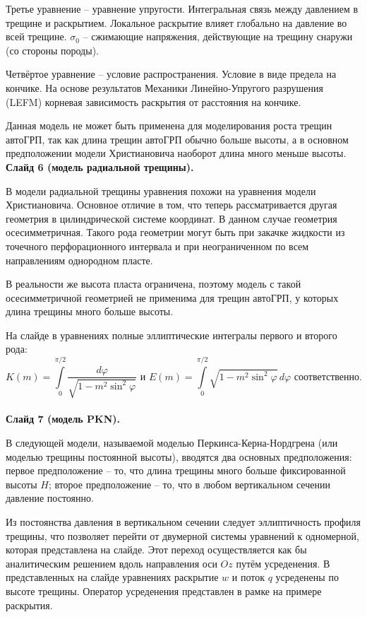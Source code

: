 \documentclass[a4paper, 12pt]{article}
\begin{document}
Третье уравнение -- уравнение упругости.
Интегральная связь между давлением в трещине и раскрытием.
Локальное раскрытие влияет глобально на давление во всей трещине.
$\sigma_0$ -- сжимающие напряжения, действующие на трещину снаружи (со стороны породы).

Четвёртое уравнение -- условие распространения.
Условие в виде предела на кончике.
На основе результатов Механики Линейно-Упругого разрушения (LEFM) корневая зависимость раскрытия от расстояния на кончике.

Данная модель не может быть применена для моделирования роста трещин автоГРП, так как длина трещин автоГРП обычно больше высоты, а в основном предположении модели Христиановича наоборот длина много меньше высоты.\\

\textbf{Слайд 6 (модель радиальной трещины).}

В модели радиальной трещины уравнения похожи на уравнения модели Христиановича.
Основное отличие в том, что теперь рассматривается другая геометрия в цилиндрической системе координат.
В данном случае геометрия осесимметричная.
Такого рода геометрии могут быть при закачке жидкости из точечного перфорационного интервала и при неограниченном по всем направлениям однородном пласте.

В реальности же высота пласта ограничена, поэтому модель с такой осесимметричной геометрией не применима для трещин автоГРП, у которых длина трещины много больше высоты.

На слайде в уравнениях полные эллиптические интегралы первого и второго рода:
$$K(m)=\int\limits_{0}^{\pi/2}{\frac{d\varphi}{\sqrt{1-m^2\sin^2{\!\varphi}}}}\text{ и } E(m)=\int\limits_{0}^{\pi/2}{\sqrt{1-m^2\sin^2{\!\varphi}}\,d\varphi}\text{ соответственно.}$$\\

\textbf{Слайд 7 (модель PKN).}

В следующей модели, называемой моделью Перкинса-Керна-Нордгрена (или моделью трещины постоянной высоты), вводятся два основных предположения: первое предположение -- то, что длина трещины много больше фиксированной высоты $H$; второе предположение -- то, что в любом вертикальном сечении давление постоянно.

Из постоянства давления в вертикальном сечении следует эллиптичность профиля трещины, что позволяет перейти от двумерной системы уравнений к одномерной, которая представлена на слайде.
Этот переход осуществляется как бы аналитическим решением вдоль направления оси $Oz$ путём усреденения.
В представленных на слайде уравнениях раскрытие $w$ и поток $q$ усреденены по высоте трещины.
Оператор усреденения представлен в рамке на примере раскрытия.
\end{document}
